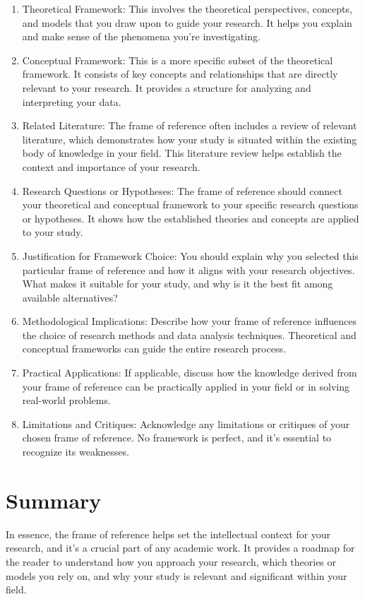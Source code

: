 \begin{enumerate}
\item Theoretical Framework: This involves the theoretical perspectives, concepts, and models that you draw upon to guide your research. It helps you explain and make sense of the phenomena you're investigating.

\item Conceptual Framework: This is a more specific subset of the theoretical framework. It consists of key concepts and relationships that are directly relevant to your research. It provides a structure for analyzing and interpreting your data.

\item Related Literature: The frame of reference often includes a review of relevant literature, which demonstrates how your study is situated within the existing body of knowledge in your field. This literature review helps establish the context and importance of your research.

\item Research Questions or Hypotheses: The frame of reference should connect your theoretical and conceptual framework to your specific research questions or hypotheses. It shows how the established theories and concepts are applied to your study.

\item Justification for Framework Choice: You should explain why you selected this particular frame of reference and how it aligns with your research objectives. What makes it suitable for your study, and why is it the best fit among available alternatives?

\item Methodological Implications: Describe how your frame of reference influences the choice of research methods and data analysis techniques. Theoretical and conceptual frameworks can guide the entire research process.


\item Practical Applications: If applicable, discuss how the knowledge derived from your frame of reference can be practically applied in your field or in solving real-world problems.

\item Limitations and Critiques: Acknowledge any limitations or critiques of your chosen frame of reference. No framework is perfect, and it's essential to recognize its weaknesses.

\end{enumerate}

\section{Summary}
In essence, the frame of reference helps set the intellectual context for your research, and it's a crucial part of any academic work. It provides a roadmap for the reader to understand how you approach your research, which theories or models you rely on, and why your study is relevant and significant within your field.
 